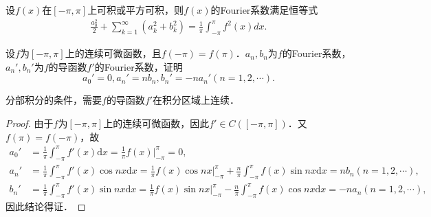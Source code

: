 \documentclass[../../main.tex]{subfiles}
\begin{document}
\begin{theorem}[Parseval恒等式]\label{theorem:Parseval恒等式}
设$f(x)$在$[-\pi,\pi]$上可积或平方可积，则$f(x)$的Fourier系数满足恒等式
\begin{align*}
\frac{a_0^2}{2}+\sum_{k = 1}^{\infty}(a_k^2 + b_k^2)=\frac{1}{\pi}\int_{-\pi}^{\pi}f^2(x)dx.
\end{align*}
\end{theorem}

\begin{lemma}\label{lemma:Fourier级数与其导函数的系数关系}
设$f$为$[-\pi,\pi]$上的连续可微函数，且$f(-\pi)=f(\pi)$．$a_n,b_n$为$f$的Fourier系数，$a_{n}',b_{n}'$为$f$的导函数$f'$的Fourier系数，证明
$$a_{0}'=0,a_{n}'=nb_n,b_{n}'=-na_{n}'(n=1,2,\cdots).$$
\end{lemma}
\begin{remark}
分部积分的条件，需要$f$的导函数$f'$在积分区域上连续．
\end{remark}
\begin{proof}
由于$f$为$[-\pi,\pi]$上的连续可微函数，因此$f'\in C([-\pi,\pi])$．又$f(\pi)=f(-\pi)$，故
\begin{align*}
a_{0}'&=\frac{1}{\pi}\int_{-\pi}^{\pi}f'(x)\mathrm{d}x=\frac{1}{\pi}f(x)\Big|_{-\pi}^{\pi}=0,\\
a_{n}'&=\frac{1}{\pi}\int_{-\pi}^{\pi}f'(x)\cos nx\mathrm{d}x=\frac{1}{\pi}f(x)\cos nx\Big|_{-\pi}^{\pi}+\frac{n}{\pi}\int_{-\pi}^{\pi}f(x)\sin nx\mathrm{d}x=nb_n(n=1,2,\cdots),\\
b_{n}'&=\frac{1}{\pi}\int_{-\pi}^{\pi}f'(x)\sin nx\mathrm{d}x=\frac{1}{\pi}f(x)\sin nx\Big|_{-\pi}^{\pi}-\frac{n}{\pi}\int_{-\pi}^{\pi}f(x)\cos nx\mathrm{d}x=-na_n(n=1,2,\cdots),
\end{align*}
因此结论得证．
\end{proof}
\end{document}
